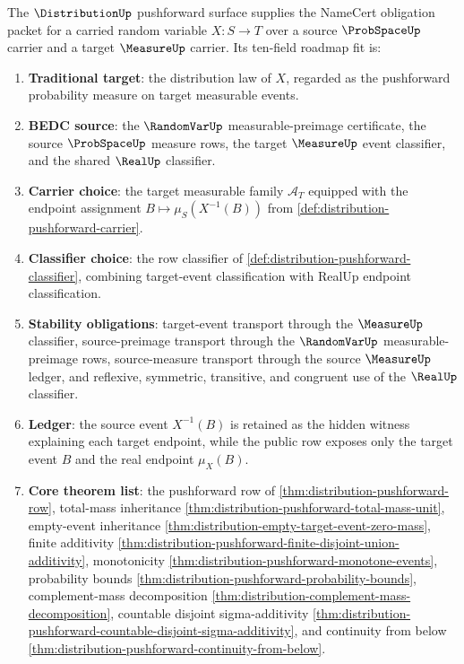 \begin{theorem}
\label{thm:distribution-namecert-obligation-packet}
The $\DistributionUp$ pushforward surface supplies the NameCert obligation packet for a carried random variable $X:S\to T$ over a source $\ProbSpaceUp$ carrier and a target $\MeasureUp$ carrier. Its ten-field roadmap fit is:
\begin{enumerate}
\item \textbf{Traditional target}: the distribution law of $X$, regarded as the pushforward probability measure on target measurable events.
\item \textbf{BEDC source}: the $\RandomVarUp$ measurable-preimage certificate, the source $\ProbSpaceUp$ measure rows, the target $\MeasureUp$ event classifier, and the shared $\RealUp$ classifier.
\item \textbf{Carrier choice}: the target measurable family $\mathcal{A}_T$ equipped with the endpoint assignment $B\mapsto\mu_S(X^{-1}(B))$ from \autoref{def:distribution-pushforward-carrier}.
\item \textbf{Classifier choice}: the row classifier of \autoref{def:distribution-pushforward-classifier}, combining target-event classification with RealUp endpoint classification.
\item \textbf{Stability obligations}: target-event transport through the $\MeasureUp$ classifier, source-preimage transport through the $\RandomVarUp$ measurable-preimage rows, source-measure transport through the source $\MeasureUp$ ledger, and reflexive, symmetric, transitive, and congruent use of the $\RealUp$ classifier.
\item \textbf{Ledger}: the source event $X^{-1}(B)$ is retained as the hidden witness explaining each target endpoint, while the public row exposes only the target event $B$ and the real endpoint $\mu_X(B)$.
\item \textbf{Core theorem list}: the pushforward row of \autoref{thm:distribution-pushforward-row}, total-mass inheritance \autoref{thm:distribution-pushforward-total-mass-unit}, empty-event inheritance \autoref{thm:distribution-empty-target-event-zero-mass}, finite additivity \autoref{thm:distribution-pushforward-finite-disjoint-union-additivity}, monotonicity \autoref{thm:distribution-pushforward-monotone-events}, probability bounds \autoref{thm:distribution-pushforward-probability-bounds}, complement-mass decomposition \autoref{thm:distribution-complement-mass-decomposition}, countable disjoint sigma-additivity \autoref{thm:distribution-pushforward-countable-disjoint-sigma-additivity}, and continuity from below \autoref{thm:distribution-pushforward-continuity-from-below}.

\end{enumerate}
\end{theorem}
